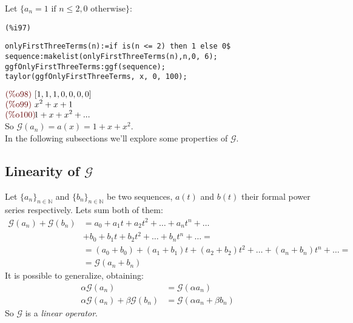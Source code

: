 Let $\{a_n = 1 \text{ if } n \leq 2,  0 \text{ otherwise}\}$:\\
\noindent
\begin{minipage}[t]{8ex}{\color{red}\bf
\begin{verbatim}
(%i97)
\end{verbatim}}
\end{minipage}
\begin{minipage}[t]{\textwidth}{\color{blue}
\begin{verbatim}
onlyFirstThreeTerms(n):=if is(n <= 2) then 1 else 0$
sequence:makelist(onlyFirstThreeTerms(n),n,0, 6);
ggfOnlyFirstThreeTerms:ggf(sequence);
taylor(ggfOnlyFirstThreeTerms, x, 0, 100);
\end{verbatim}}
\end{minipage}
\begin{math}\displaystyle
\parbox{8ex}{\color{labelcolor}(\%o98) }
[1,1,1,0,0,0,0]
\end{math}\\
\begin{math}\displaystyle
\parbox{8ex}{\color{labelcolor}(\%o99) }
{x}^{2}+x+1
\end{math}\\
\begin{math}\displaystyle
\parbox{8ex}{\color{labelcolor}(\%o100) }
1+x+{x}^{2}+...
\end{math}\\
So $\mathcal{G}(a_n) =a(x)=1+{x}+{x}^{2}$.\\

In the following subsections we'll explore some properties of
$\mathcal{G} $.

\subsection{Linearity of $\mathcal{G} $}
Let $\{a_n\}_{n\in\mathbb{N} }$ and $\{b_n\}_{n\in\mathbb{N} } $ be
two sequences, $a(t)$ and $b(t)$ their formal power series
respectively. Lets sum both of them:
\begin{displaymath}
  \begin{split}
    \mathcal{G} (a_n)+ \mathcal{G} (b_n) &= a_0 + a_1 t
    + a_2 t^2 + \ldots + a_n t^n + \ldots \\
    &+ b_0 + b_1 t + b_2 t^2 + \ldots + b_n t^n + \ldots =\\
    &= (a_0 + b_0) + (a_1+b_1) t + (a_2 + b_2) t^2 + \ldots +
    (a_n+b_n) t^n + \ldots =\\
    &= \mathcal{G}(a_n + b_n)
  \end{split}
\end{displaymath}
It is possible to generalize, obtaining:
\begin{displaymath}
  \begin{split}
    \alpha\mathcal{G}(a_n) &= \mathcal{G}(\alpha a_n)\\
    \alpha\mathcal{G}(a_n) +  \beta\mathcal{G}(b_n) &=
    \mathcal{G}(\alpha a_n + \beta b_n)
  \end{split}
\end{displaymath}
So $\mathcal{G}$ is a \emph{linear operator}.

